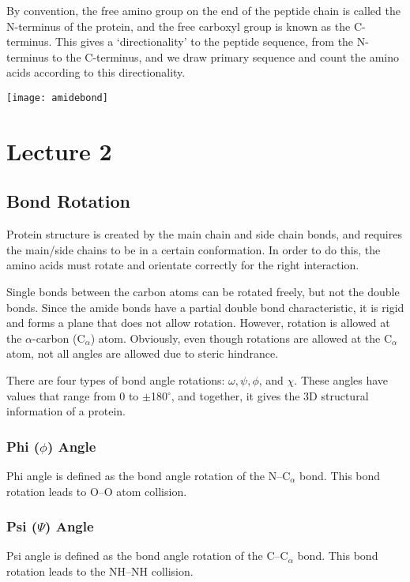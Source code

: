\documentclass[a4paper, 12pt]{report}
\newcommand{\mychapter}[2]{
    \setcounter{chapter}{#1}
    \setcounter{section}{0}
    \chapter*{#2}
    \addcontentsline{toc}{chapter}{#2}
}
\begin{document}
By convention, the free amino group on the end of the peptide chain is called the N-terminus of the protein, and the free carboxyl group is known as the C-terminus.
This gives a `directionality' to the peptide sequence, from the N-terminus to the C-terminus, and we draw primary sequence and count the amino acids according to this directionality.

\begin{center}
\texttt{[image: amidebond]}
\end{center}

\mychapter{2}{Lecture 2}

\section{Bond Rotation}

Protein structure is created by the main chain and side chain bonds, and requires the main/side chains to be in a certain conformation.
In order to do this, the amino acids must rotate and orientate correctly for the right interaction.

Single bonds between the carbon atoms can be rotated freely, but not the double bonds.
Since the amide bonds have a partial double bond characteristic, it is rigid and forms a plane that does not allow rotation.
However, rotation is allowed at the $\alpha$-carbon (C$_{\alpha}$) atom.
Obviously, even though rotations are allowed at the C$_{\alpha}$ atom, not all angles are allowed due to steric hindrance.

There are four types of bond angle rotations: $\omega, \psi, \phi$, and $\chi$.
These angles have values that range from 0 to $\pm$180$^{\circ}$, and together, it gives the 3D structural information of a protein.

\subsection{Phi ($\phi$) Angle}

Phi angle is defined as the bond angle rotation of the N--C$_{\alpha}$ bond.
This bond rotation leads to O--O atom collision.

\subsection{Psi ($\Psi$) Angle}

Psi angle is defined as the bond angle rotation of the C--C$_{\alpha}$ bond.
This bond rotation leads to the NH--NH collision.
\end{document}
